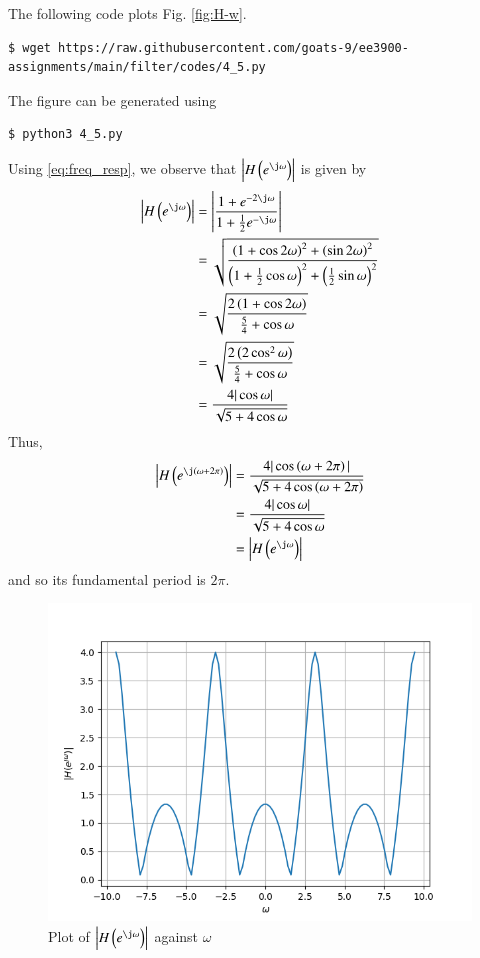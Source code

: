 \documentclass[journal,12pt,twocolumn]{IEEEtran}
\renewcommand\thesection{\arabic{section}}
\begin{document}
\begin{enumerate}[label=\thesection.\arabic*]
\solution The following code plots Fig. \eqref{fig:H-w}.
\begin{lstlisting}
$ wget https://raw.githubusercontent.com/goats-9/ee3900-assignments/main/filter/codes/4_5.py
\end{lstlisting}
The figure can be generated using
\begin{lstlisting}
$ python3 4_5.py
\end{lstlisting}
Using \eqref{eq:freq_resp}, we observe that $\left|H\brak{e^{\j\omega}}\right|$ is given by
\begin{align}
	\left|H\brak{e^{\j\omega}}\right| &= \left|\frac{1 + e^{-2\j\omega}}{1 + \frac{1}{2}e^{-\j\omega}}\right| \\
									  &= \sqrt{\frac{\brak{1 + \cos{2\omega}}^2 + \brak{\sin{2\omega}}^2}{\brak{1 + \frac{1}{2}\cos{\omega}}^2 + \brak{\frac{1}{2}\sin{\omega}}^2}}\\
									  &= \sqrt{\frac{2\brak{1 + \cos{2\omega}}}{\frac{5}{4} + \cos{\omega}}} \\
									  &= \sqrt{\frac{2\brak{2\cos^2{\omega}}}{\frac{5}{4} + \cos{\omega}}} \\
									  &= \frac{4|\cos{\omega}|}{\sqrt{5 + 4\cos{\omega}}}
\end{align}
Thus,
\begin{align}
	\left|H\brak{e^{\j\brak{\omega + 2\pi}}}\right| &= \frac{4|\cos\brak{\omega + 2\pi}|}{\sqrt{5 + 4\cos\brak{\omega + 2\pi}}} \\
											   &= \frac{4|\cos{\omega}|}{\sqrt{5 + 4\cos{\omega}}} \\
											   &= \left|H\brak{e^{\j\omega}}\right|	
\end{align}
and so its fundamental period is $2\pi$.
\begin{figure}[!ht]
	\centering
	\includegraphics[width=\columnwidth]{figs/4_5.png}
	\caption{Plot of $\left|H\brak{e^{\j\omega}}\right|$ against $\omega$}
	\label{fig:H-w}
\end{figure}


\end{enumerate}
\end{document}
